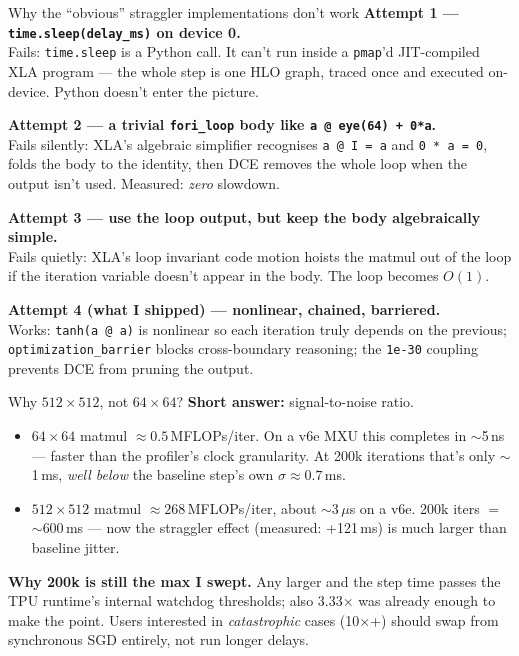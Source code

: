 \documentclass[aspectratio=169,10pt]{beamer}
\begin{document}
\begin{frame}{Why the ``obvious'' straggler implementations don't work}
  \textbf{Attempt 1 — \texttt{time.sleep(delay\_ms)} on device 0.}\\
  \textcolor{warn}{Fails:} \texttt{time.sleep} is a Python call. It can't run inside a
  \texttt{pmap}'d JIT-compiled XLA program — the whole step is one HLO graph, traced
  once and executed on-device. Python doesn't enter the picture.

  \vspace{0.5em}
  \textbf{Attempt 2 — a trivial \texttt{fori\_loop} body like \texttt{a @ eye(64) + 0*a}.}\\
  \textcolor{warn}{Fails silently:} XLA's algebraic simplifier recognises
  \texttt{a @ I = a} and \texttt{0 * a = 0}, folds the body to the identity, then DCE
  removes the whole loop when the output isn't used. Measured: \emph{zero} slowdown.

  \vspace{0.5em}
  \textbf{Attempt 3 — use the loop output, but keep the body algebraically simple.}\\
  \textcolor{warn}{Fails quietly:} XLA's loop invariant code motion hoists the matmul
  out of the loop if the iteration variable doesn't appear in the body. The loop becomes
  $O(1)$.

  \vspace{0.5em}
  \textbf{Attempt 4 (what I shipped) — nonlinear, chained, barriered.}\\
  \textcolor{ok}{Works:} \texttt{tanh(a @ a)} is nonlinear so each iteration truly
  depends on the previous; \texttt{optimization\_barrier} blocks cross-boundary
  reasoning; the \texttt{1e-30} coupling prevents DCE from pruning the output.
\end{frame}

\begin{frame}{Why $512\times512$, not $64\times64$?}
  \textbf{Short answer:} signal-to-noise ratio.

  \vspace{0.4em}
  \begin{itemize}
    \item $64\times64$ matmul $\approx 0.5$\,MFLOPs/iter. On a v6e MXU this completes in
          $\sim$5\,ns — faster than the profiler's clock granularity. At 200k iterations
          that's only $\sim$1\,ms, \emph{well below} the baseline step's own $\sigma \approx 0.7$\,ms.
    \item $512\times512$ matmul $\approx 268$\,MFLOPs/iter, about $\sim$3\,$\mu$s on a v6e.
          200k iters $=$ $\sim$600\,ms — now the straggler effect (measured: +121\,ms)
          is much larger than baseline jitter.
  \end{itemize}

  \vspace{0.4em}
  \textbf{Why 200k is still the max I swept.} Any larger and the step time passes the
  TPU runtime's internal watchdog thresholds; also 3.33$\times$ was already enough to
  make the point. Users interested in \emph{catastrophic} cases (10$\times$+) should
  swap from synchronous SGD entirely, not run longer delays.
\end{frame}
\end{document}
